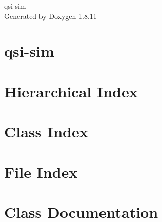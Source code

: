 \documentclass[twoside]{book}
\newcommand{\+}{\discretionary{\mbox{\scriptsize$\hookleftarrow$}}{}{}}
\newcommand{\clearemptydoublepage}{%
  \newpage{\pagestyle{empty}\cleardoublepage}%
}
\begin{document}
\hypersetup{pageanchor=false,
             bookmarksnumbered=true,
             pdfencoding=unicode
            }
\begin{titlepage}
\vspace*{7cm}
\begin{center}%
{\Large qsi-\/sim }\\
\vspace*{1cm}
{\large Generated by Doxygen 1.8.11}\\
\end{center}
\end{titlepage}
\clearemptydoublepage
\tableofcontents
\clearemptydoublepage
{}
\hypersetup{pageanchor=true}

\chapter{qsi-\/sim}
\label{index}\hypertarget{index}{}
\chapter{Hierarchical Index}

\chapter{Class Index}

\chapter{File Index}

\chapter{Class Documentation}












































\end{document}
